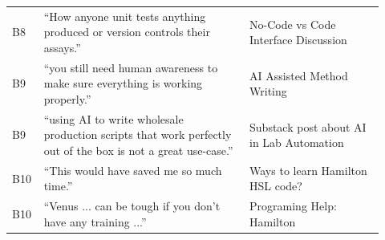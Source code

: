 \begin{longtable}{@{}p{0.06\linewidth}p{0.52\linewidth}p{0.34\linewidth}@{}}
B8 & ``How anyone unit tests anything produced or version controls their assays.'' & No-Code vs Code Interface Discussion \\
B9 & ``you still need human awareness to make sure everything is working properly.'' & AI Assisted Method Writing \\
B9 & ``using AI to write wholesale production scripts that work perfectly out of the box is not a great use-case.'' & Substack post about AI in Lab Automation \\
B10 & ``This would have saved me so much time.'' & Ways to learn Hamilton HSL code? \\
B10 & ``Venus ... can be tough if you don't have any training ...'' & Programing Help: Hamilton \\
\end{longtable}
